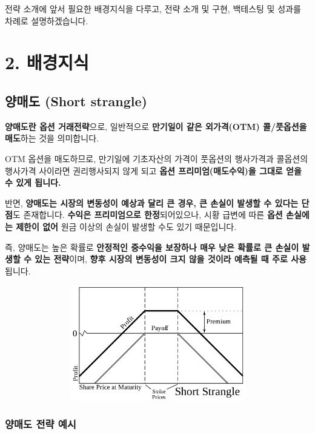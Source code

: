 \documentclass[
  a4paper,
  DIV=11,
  numbers=noendperiod]{scrreprt}
\begin{document}
전략 소개에 앞서 필요한 배경지식을 다루고, 전략 소개 및 구현, 백테스팅
및 성과를 차례로 설명하겠습니다.

\section*{2. 배경지식}\label{uxbc30uxacbduxc9c0uxc2dd}


\subsection*{양매도 (Short
strangle)}\label{uxc591uxb9e4uxb3c4-short-strangle}

\textbf{양매도란 옵션 거래전략}으로, 일반적으로 \textbf{만기일이 같은
외가격(OTM) 콜/풋옵션을 매도}하는 것을 의미합니다.

OTM 옵션을 매도하므로, 만기일에 기초자산의 가격이 풋옵션의 행사가격과
콜옵션의 행사가격 사이라면 권리행사되지 않게 되고 \textbf{옵션
프리미엄(매도수익)을 그대로 얻을 수 있게 됩니다.}

반면, \textbf{양매도는 시장의 변동성이 예상과 달리 큰 경우, 큰 손실이
발생할 수 있다는 단점}도 존재합니다. \textbf{수익은 프리미엄으로
한정}되어있으나, 시황 급변에 따른 \textbf{옵션 손실에는 제한이 없어}
원금 이상의 손실이 발생할 수도 있기 때문입니다.

즉, 양매도는 높은 확률로 \textbf{안정적인 중수익을 보장하나 매우 낮은
확률로 큰 손실이 발생할 수 있는 전략}이며, \textbf{향후 시장의 변동성이
크지 않을 것이라 예측될 때 주로 사용}됩니다.

\begin{center}
\includegraphics[width=150mm,height=50mm]{image/shortstrangle.png}
\end{center}

\subsubsection*{양매도 전략
예시}\label{uxc591uxb9e4uxb3c4-uxc804uxb7b5-uxc608uxc2dc}
\end{document}

